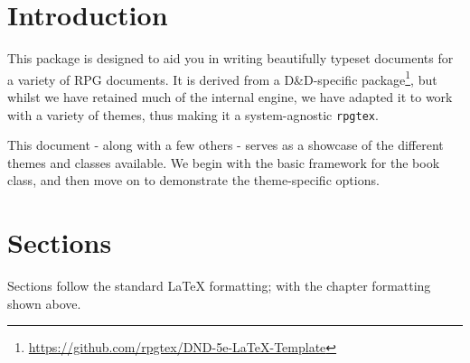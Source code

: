
\frontmatter
{}

\tableofcontents


\mainmatter{}




	\chapter{Introduction}


	 This package is designed to aid you in writing beautifully typeset documents for a variety of RPG documents. It is derived from {a D\&D-specific package}\footnote{\url{https://github.com/rpgtex/DND-5e-LaTeX-Template}}, but whilst we have retained much of the internal engine, we have adapted it to work with a variety of themes, thus making it a system-agnostic \verb|rpgtex|.

	This document - along with a few others - serves as a showcase of the different themes and classes available. We begin with the basic framework for the book class, and then move on to demonstrate the theme-specific options.

	\chapter{Sections}
		Sections follow the standard \LaTeX{} formatting; with the chapter formatting shown above.
